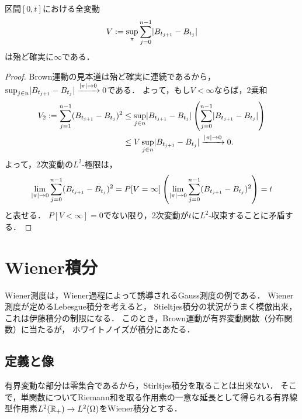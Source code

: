 \documentclass[uplatex,dvipdfmx]{jsreport}
\begin{document}
\begin{corollary}[全変動の発散]
    区間$[0,t]$における全変動
    \[V:=\sup_{\pi}\sum^{n-1}_{j=0}\lvert B_{t_{j+1}}-B_{t_j}\rvert\]
    は殆ど確実に$\infty$である．
\end{corollary}
\begin{proof}
    Brown運動の見本道は殆ど確実に連続であるから，$\sup_{j\in n}\lvert B_{t_{j+1}}-B_{t_j}\rvert\xrightarrow{\lvert\pi\rvert\to0}0$である．
    よって，もし$V<\infty$ならば，2乗和
    \begin{align*}
        V_2:=\sum^{n-1}_{j=1}(B_{t_{j+1}}-B_{t_j})^2&\le\sup_{j\in n}\lvert B_{t_{j+1}}-B_{t_j}\rvert\left(\sum^{n-1}_{j=0}\lvert B_{t_{j+1}}-B_{t_j}\rvert\right)\\
        &\le V\sup_{j\in n}\lvert B_{t_{j+1}}-B_{t_j}\rvert\xrightarrow{\lvert\pi\rvert\to0}0.
    \end{align*}
    よって，2次変動の$L^2$-極限は，
    \[\lim_{\lvert\pi\rvert\to0}\sum^{n-1}_{j=0}(B_{t_{j+1}}-B_{t_j})^2=P[V=\infty]\left(\lim_{\lvert\pi\rvert\to0}\sum^{n-1}_{j=0}(B_{t_{j+1}}-B_{t_j})^2\right)=t\]
    と表せる．
    $P[V<\infty]=0$でない限り，2次変動が$t$に$L^2$-収束することに矛盾する．
\end{proof}



\section{Wiener積分}

\begin{tcolorbox}[colframe=ForestGreen, colback=ForestGreen!10!white,breakable,colbacktitle=ForestGreen!40!white,coltitle=black,fonttitle=\bfseries\sffamily,
    title=]
    Wiener測度は，Wiener過程によって誘導されるGauss測度の例である．
    Wiener測度が定めるLebesgue積分を考えると，
    Stieltjes積分の状況がうまく模倣出来，これは伊藤積分の制限になる．
    このとき，Brown運動が有界変動関数（分布関数）に当たるが，
    ホワイトノイズが積分にあたる．
\end{tcolorbox}

\subsection{定義と像}

\begin{tcolorbox}[colframe=ForestGreen, colback=ForestGreen!10!white,breakable,colbacktitle=ForestGreen!40!white,coltitle=black,fonttitle=\bfseries\sffamily,
title=]
    有界変動な部分は零集合であるから，Stirltjes積分を取ることは出来ない．
    そこで，単関数についてRiemann和を取る作用素の一意な延長として得られる有界線型作用素$L^2(\mathbb{R}_+)\to L^2(\Omega)$をWiener積分とする．
\end{tcolorbox}
\end{document}
